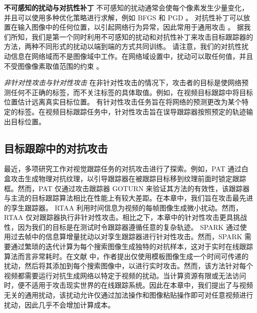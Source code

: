 \textbf{不可感知的扰动与对抗性补丁} 不可感知的扰动通常会使每个像素发生少量变化，并且可以使用多种优化策略进行求解，例如 BFGS \cite{intriguing} 和 PGD \cite{PGD}。
对抗性补丁可以放置在输入图像中的任何位置，以引起网络行为异常，因此常用于通用攻击 \cite{patch}。
据我们所知，我们是第一个同时利用不可感知的扰动和对抗性补丁来攻击目标跟踪器的方法，两种不同形式的扰动以端到端的方式共同训练。
请注意，我们的对抗性扰动信息在网络域而不是图像域中工作。在网络域设置中，扰动可以取任何值，并且不受图像像素取值范围的约束 \cite{karmon2018lavan}。

\textit{非针对性攻击与针对性攻击} 在非针对性攻击的情况下，攻击者的目标是使网络预测任何不正确的标签，而不关注标签的具体取值。例如，在视频目标跟踪中将目标位置估计远离真实目标位置。
有针对性攻击任务旨在将网络的预测更改为某个特定的标签。在视频目标跟踪任务中，针对性攻击旨在误导跟踪器按照预定的轨迹输出目标位置。

\subsection{目标跟踪中的对抗攻击}

最近，多项研究工作对视觉跟踪任务的对抗攻击进行了探索。例如，PAT \cite{PAT} 通过白盒攻击生成物理对抗纹理，以引导跟踪器在被跟踪目标移到纹理前面时锁定跟踪框。然而，PAT 仅通过攻击跟踪器 GOTURN \cite{GOTURN} 来验证其方法的有效性，该跟踪器与主流的目标跟踪算法相比在性能上有较大差距。在本章中，我们旨在攻击最先进的孪生跟踪器。
RTAA \cite{RTAA} 利用时间信息为视频的每帧图像生成微小扰动。然而，RTAA 仅对跟踪器执行非针对性攻击。相比之下，本章中的针对性攻击更具挑战性，因为我们的目标是在测试时令跟踪器遵循任意的复杂轨迹。
SPARK \cite{SPARK} 通过使用过去帧中的信息算增量扰动以对孪生跟踪器进行针对性攻击。然而，SPARK 需要通过繁琐的迭代计算为每个搜索图像生成独特的对抗样本，这对于实时在线跟踪算法而言非常耗时。在文献 \cite{TTP} 中，作者提出仅使用模板图像生成一个时间可传递的扰动，然后将其添加到每个搜索图像中，以进行实时攻击。然而，该方法针对每个视频都需要运行对抗生成网络以特定于视频的扰动。当计算资源有限或无法访问时，便不适用于攻击现实世界的在线跟踪系统。因此在本章中，我们提出了与视频无关的通用扰动，该扰动允许仅通过加法操作和图像粘贴操作即可对任意视频进行扰动，因此几乎不会增加计算成本。

